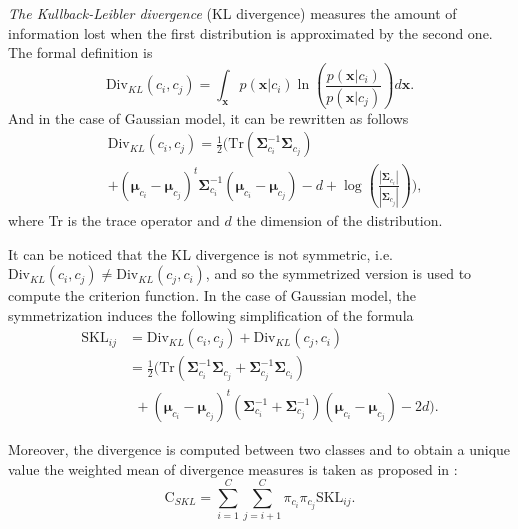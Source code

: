 \documentclass[journal,peerreview,onecolumn]{IEEEtran}
\begin{document}
            \emph{The Kullback-Leibler divergence} (KL divergence) measures the amount of information lost when the first distribution is approximated by the second one\cite{kullback1987letter}. The formal definition is
            \begin{equation}
                \text{Div}_{KL}(c_i,c_j) = \int_\mathbf{x} p(\mathbf{x}|c_i) \ln \left(\frac{p(\mathbf{x}|c_i)}{p(\mathbf{x}|c_j)}\right) d\mathbf{x}.
            \end{equation}
            And in the case of Gaussian model, it can be rewritten as follows
            \begin{align}
                &\text{Div}_{KL}(c_i,c_j) = \frac{1}{2} \biggl( \text{Tr} (\boldsymbol{\Sigma}_{c_i}^{-1} \boldsymbol{\Sigma}_{c_j}) \nonumber \\
                & + (\boldsymbol{\mu}_{c_i} - \boldsymbol{\mu}_{c_j})^t \boldsymbol{\Sigma}_{c_i}^{-1} (\boldsymbol{\mu}_{c_i} - \boldsymbol{\mu}_{c_j}) - d + \log \left( \frac{|\boldsymbol{\Sigma}_{c_i}|}{|\boldsymbol{\Sigma}_{c_j}|} \right) \biggr),
            \end{align}
            where Tr is the trace operator and $d$ the dimension of the distribution.

            It can be noticed that the KL divergence is not symmetric, i.e. $\text{Div}_{KL}(c_i,c_j) \ne \text{Div}_{KL}(c_j,c_i)$, and so the symmetrized version is used to compute the criterion function. In the case of Gaussian model, the symmetrization induces the following simplification of the formula
            \begin{align}
                \text{SKL}_{ij} &=\text{Div}_{KL}(c_i,c_j) + \text{Div}_{KL}(c_j,c_i) \nonumber \\
                &= \frac{1}{2} \biggl( \text{Tr} (\boldsymbol{\Sigma}_{c_i}^{-1} \boldsymbol{\Sigma}_{c_j} + \boldsymbol{\Sigma}_{c_j}^{-1} \boldsymbol{\Sigma}_{c_i}) \nonumber \\
                &~~+ (\boldsymbol{\mu}_{c_i} - \boldsymbol{\mu}_{c_j})^t (\boldsymbol{\Sigma}_{c_i}^{-1} + \boldsymbol{\Sigma}_{c_j}^{-1}) (\boldsymbol{\mu}_{c_i} - \boldsymbol{\mu}_{c_j}) - 2d \biggr).
            \end{align}

            Moreover, the divergence is computed between two classes and to obtain a unique value the weighted mean of divergence measures is taken as proposed in \cite{bruzzone1995extension}:
            \begin{equation}
                \text{C}_{SKL} = \sum_{i=1}^{C} \sum_{j=i + 1}^{C} \pi_{c_i} \pi_{c_j} \text{SKL}_{ij}.
            \end{equation}
\end{document}
